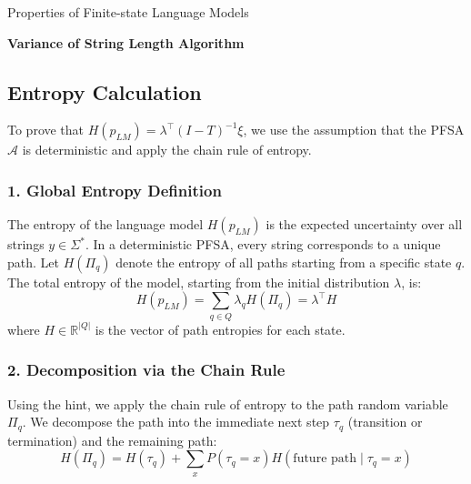 \begin{question}{Properties of Finite-state Language Models}
\begin{subquestion}{\textbf{Variance of String Length Algorithm}}
\end{subquestion}

\begin{subquestion}

\subsection*{Entropy Calculation}

To prove that $H(p_{LM}) = \lambda^{\top}(I-T)^{-1}\xi$, we use the assumption that the PFSA $\mathcal{A}$ is deterministic and apply the chain rule of entropy.

\subsubsection*{1. Global Entropy Definition}
The entropy of the language model $H(p_{LM})$ is the expected uncertainty over all strings $y \in \Sigma^*$. In a deterministic PFSA, every string corresponds to a unique path. Let $H(\Pi_q)$ denote the entropy of all paths starting from a specific state $q$. The total entropy of the model, starting from the initial distribution $\lambda$, is:
\begin{equation}
    H(p_{LM}) = \sum_{q \in Q} \lambda_q H(\Pi_q) = \lambda^{\top} H
\end{equation}
where $H \in \mathbb{R}^{|Q|}$ is the vector of path entropies for each state.

\subsubsection*{2. Decomposition via the Chain Rule}
Using the hint, we apply the chain rule of entropy to the path random variable $\Pi_q$. We decompose the path into the immediate next step $\tau_q$ (transition or termination) and the remaining path:
\begin{equation}
    H(\Pi_q) = H(\tau_q) + \sum_{x} P(\tau_q = x) H(\text{future path} \mid \tau_q = x)
\end{equation}


\end{subquestion}
\end{question}

